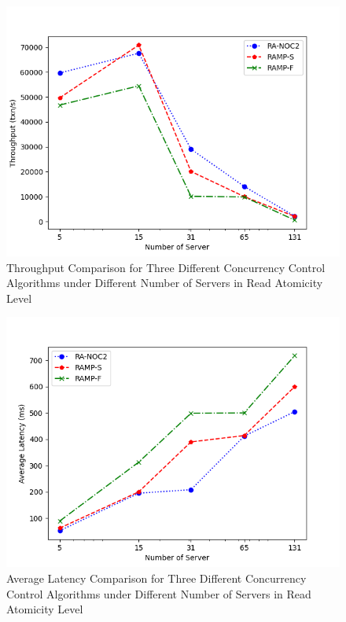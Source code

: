 \begin{figure}[H]
    \centering
    \includegraphics[width=0.8\linewidth]{figure/3-ra-t.png}
    \caption{Throughput Comparison for Three Different Concurrency Control Algorithms under Different Number of Servers in Read Atomicity Level}
    \label{fig:7}
\end{figure}

\begin{figure}[H]
    \centering
    \includegraphics[width=0.8\linewidth]{figure/3-ra-al.png}
    \caption{Average Latency Comparison for Three Different Concurrency Control Algorithms under Different Number of Servers in Read Atomicity Level}
    \label{fig:8}
\end{figure}


